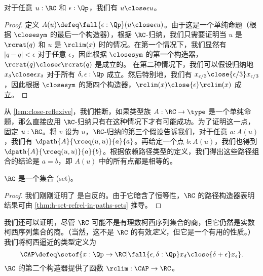 \begin{lem} \label{lem:close-reflexive}
对于任意 $u:\RC$ 和 $\epsilon:\Qp$，我们有 $u\close\epsilon u$。
\end{lem}
\begin{proof}
  定义 $A(u) \defeq \fall{\epsilon:\Qp} (u\close\epsilon u)$。由于这是一个单纯命题（根据 $\closesym$ 的最后一个构造器），根据 $\RC$-归纳，我们只需要证明当 $u$ 是 $\rcrat(q)$ 和 $u$ 是 $\rclim(x)$ 时的情况。在第一个情况下，我们显然有 $|q-q|<\epsilon$ 对于任意 $\epsilon$，因此根据 $\closesym$ 的第一个构造器，$\rcrat(q) \close\epsilon \rcrat(q)$ 是成立的。
  在第二种情况下，我们可以假设归纳地 $x_\delta \close\epsilon x_\delta$ 对于所有 $\delta,\epsilon:\Qp$ 成立。然后特别地，我们有 $x_{\epsilon/3} \close{\epsilon/3} x_{\epsilon/3}$，因此根据 $\closesym$ 的第四个构造器，$\rclim(x) \close{\epsilon} \rclim(x)$ 成立。
\end{proof}

从 \cref{lem:close-reflexive}，我们推断，如果类型族 $A:\RC\to\type$ 是一个单纯命题，那么直接应用 $\RC$-归纳只有在这种情况下才有可能成功。为了证明这一点，固定 $u:\RC$。将 $v$ 设为 $u$，$\RC$-归纳的第三个假设告诉我们，对于任意 $a : A(u)$，我们有 $\dpath{A}{\rceq(u,u)}{a}{a}$。再给定一个点 $b : A(u)$，我们也得到 $\dpath{A}{\rceq(u,u)}{a}{b}$。根据依赖路径类型的定义，我们得出这些路径组合的结论是 $a = b$，即 $A(u)$ 中的所有点都是相等的。

\begin{thm}\label{thm:Cauchy-reals-are-a-set}
$\RC$ 是一个集合 (set)。
\end{thm}
\begin{proof}
  我们刚刚证明了
  是自反的。由于它暗含了恒等性，$\RC$ 的路径构造器表明结果可由 \cref{thm:h-set-refrel-in-paths-sets} 推导。
\end{proof}

我们还可以证明，尽管 $\RC$ 可能不是有理数柯西序列集合的商，但它仍然是实数柯西序列集合的商。（当然，这不是 $\RC$ 的有效\emph{定义}，但它是一个有用的性质。）我们将柯西逼近的类型定义为
%
%
%
\begin{equation*}
  \CAP \defeq
  \setof{ x : \Qp \to \RC |
  \fall{\epsilon, \delta : \Qp} x_\delta \close{\delta + \epsilon} x_\epsilon
  }.
\end{equation*}
$\RC$ 的第二个构造器提供了函数 $\rclim:\CAP\to\RC$。

